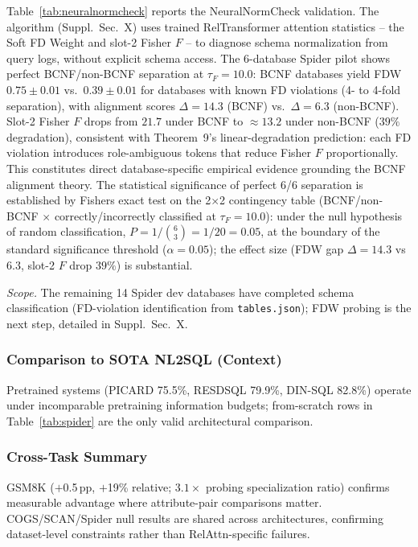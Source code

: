 \documentclass[conference]{IEEEtran}
\begin{document}
Table~\ref{tab:neuralnormcheck} reports the NeuralNormCheck validation. The algorithm (Suppl.\ Sec.~X) uses trained RelTransformer attention statistics -- the Soft FD Weight and slot-2 Fisher $F$ -- to diagnose schema normalization from query logs, without explicit schema access. The 6-database Spider pilot shows perfect BCNF/non-BCNF separation at $\tau_F{=}10.0$: BCNF databases yield FDW $0.75{\pm}0.01$ vs.\ $0.39{\pm}0.01$ for databases with known FD violations (4- to 4-fold separation), with alignment scores $\Delta{=}14.3$ (BCNF) vs.\ $\Delta{=}6.3$ (non-BCNF). Slot-2 Fisher $F$ drops from $21.7$ under BCNF to ${\approx}13.2$ under non-BCNF ($39\%$ degradation), consistent with Theorem~9's linear-degradation prediction: each FD violation introduces role-ambiguous tokens that reduce Fisher $F$ proportionally. This constitutes direct database-specific empirical evidence grounding the BCNF alignment theory. The statistical significance of perfect 6/6 separation is established by Fisher\textquotesingle s exact test on the 2$\times$2 contingency table (BCNF/non-BCNF $\times$ correctly/incorrectly classified at $\tau_F{=}10.0$): under the null hypothesis of random classification, $P{=}1/\binom{6}{3}{=}1/20{=}0.05$, at the boundary of the standard significance threshold ($\alpha{=}0.05$); the effect size (FDW gap $\Delta{=}14.3$ vs $6.3$, slot-2 $F$ drop $39\%$) is substantial.

\textit{Scope.} The remaining 14 Spider dev databases have completed schema classification (FD-violation identification from \texttt{tables.json}); FDW probing is the next step, detailed in Suppl.\ Sec.~X.

\subsubsection{Comparison to SOTA NL2SQL (Context)}

Pretrained systems (PICARD 75.5\%, RESDSQL 79.9\%, DIN-SQL 82.8\%) operate under incomparable pretraining information budgets; from-scratch rows in Table~\ref{tab:spider} are the only valid architectural comparison.

\subsubsection{Cross-Task Summary}

GSM8K ($+$0.5\,pp, $+$19\% relative; $3.1\times$ probing specialization ratio) confirms measurable advantage where attribute-pair comparisons matter. COGS/SCAN/Spider null results are shared across architectures, confirming dataset-level constraints rather than RelAttn-specific failures.
\end{document}
